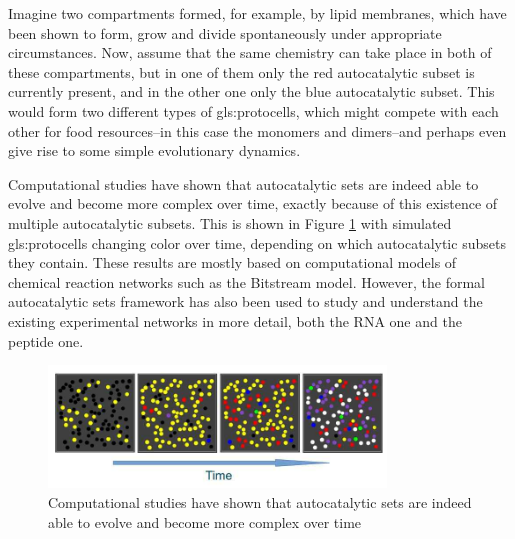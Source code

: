 \documentclass[]{article}
\begin{document}
Imagine two compartments formed, for example, by lipid membranes, which have been shown to form, grow and divide spontaneously under appropriate circumstances.
Now, assume that the same chemistry can take place in both of these compartments, but in one of them only the red autocatalytic subset is currently present, and in the other one
only the blue autocatalytic subset.
This would form two different types of \glspl{gls:protocell}, which might compete with each other for food resources--in this case the monomers and dimers--and perhaps even give rise to some simple evolutionary dynamics.



Computational studies have shown
that autocatalytic sets
are indeed able to evolve
and become more complex over time,
exactly because of this existence
of multiple autocatalytic subsets.
This is shown in Figure \ref{fig:EvolveableProtocells} with simulated
\glspl{gls:protocell} changing color over time,
depending on which autocatalytic
subsets they contain.
These results are mostly based on
computational models
of chemical reaction networks
such as the Bitstream model.
However, the formal autocatalytic
sets framework
has also been used to study
and understand
the existing experimental networks
in more detail,
both the RNA one and the peptide one.

\begin{figure}[H]
	\caption[Computational studies of autocatalytic sets]{Computational studies have shown
		that autocatalytic sets	
		are indeed able to evolve
		and become more complex over time\cite{hordijk2018population}}\label{fig:EvolveableProtocells}
	\includegraphics[width=0.8\textwidth]{EvolveableProtocells}
\end{figure}
\end{document}
